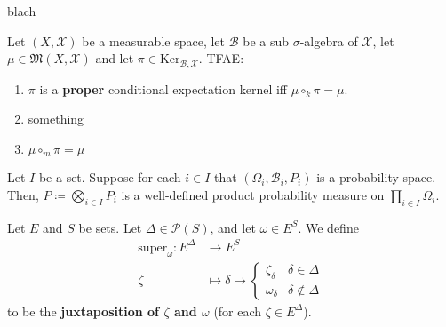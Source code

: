 \begin{lemma}
    \label{lemma:cond-exp-ker-markov-char}
    \leanok

    blach
\end{lemma}


\begin{lemma}
    \label{lemma:cond-exp-ker-proper-char}
    \leanok

    Let $(X,\mathcal{X})$ be a measurable space, let $\mathcal{B}$ be a sub $\sigma$-algebra of $\mathcal{X}$, let $\mu\in\mathfrak{M}(X,\mathcal{X})$ and let $\pi\in\text{Ker}_{\mathcal{B},\mathcal{X}}$. TFAE:
    \begin{enumerate}
        \item $\pi$ is a \textbf{proper} conditional expectation kernel iff $\mu\circ_k \pi=\mu$.
        \item something
        \item $\mu\circ_m\pi=\mu$
    \end{enumerate}
\end{lemma}


\begin{definition}
    \label{def:product-probability-measure}
    \leanok

    Let $I$ be a set. Suppose for each $i\in I$ that $(\Omega_i,\mathcal{B}_i,P_i)$ is a probability space. Then, $P\coloneqq\bigotimes_{i\in I}P_i$ is a well-defined product probability measure on $\prod_{i\in I}\Omega_i$.
\end{definition}

\begin{definition}[Juxtaposition]
    \label{def:juxtaposition}
    \leanok

    Let $E$ and $S$ be sets. Let $\Delta\in\mathcal{P}(S)$, and let $\omega\in E^S$. We define
    \begin{align}
        \text{super}_\omega:E^\Delta&\to E^S\\
        \zeta&\mapsto \delta\mapsto\begin{cases}
            \zeta_\delta & \delta\in\Delta\\
            \omega_\delta & \delta\notin\Delta
        \end{cases}
    \end{align}
    to be the \textbf{juxtaposition of $\zeta$ and $\omega$} (for each $\zeta\in E^\Delta$).
\end{definition}
